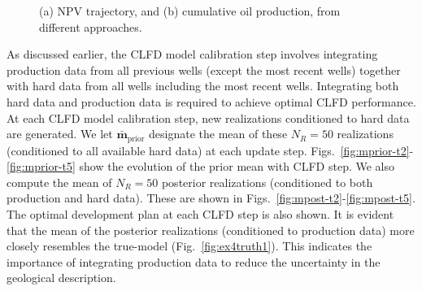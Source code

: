 \documentclass[11pt]{article}
\begin{document}
\begin{figure}
\centering
\caption{(a) NPV trajectory, and (b) cumulative oil production, from different approaches.}
\label{fig:cumOil}
\end{figure}



As discussed earlier,
the CLFD model calibration step involves integrating production data from all previous wells (except the most recent wells)
together with hard data from all wells including the most recent wells.
Integrating both hard data and production data is required to achieve optimal CLFD performance.
At each CLFD model calibration step, new realizations conditioned to hard data are generated.
We let $\bar{\mathbf{m}}_{\text{prior}}$ designate the mean
of these $N_R = 50$ realizations (conditioned to all available hard data) at each update step.
Figs.~\ref{fig:mprior-t2}-\ref{fig:mprior-t5}
show the evolution of the prior mean with CLFD step.
We also compute the mean of $N_R = 50$ posterior realizations (conditioned to both production and hard data).
These are shown in Figs.~\ref{fig:mpost-t2}-\ref{fig:mpost-t5}.
The optimal development plan at each CLFD step is also shown.
It is evident that the mean of the posterior realizations (conditioned to production data)
more closely resembles the true-model (Fig.~\ref{fig:ex4truth1}).
This indicates the importance of integrating production data to reduce the uncertainty in the geological description.
\end{document}
